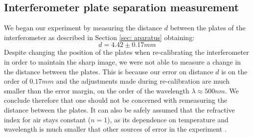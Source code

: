 \documentclass[11pt]{article}
\begin{document}
\subsection{Interferometer plate separation measurement} 
\label{sec: d}
We began our experiment by measuring the distance $d$ between the plates of the interferometer as described in Section \ref{sec: aparatus} obtaining: 
\begin{equation}
    d = 4.42 \pm 0.17 \si{mm} \label{res: d value}
\end{equation}
Despite changing the position of the plates when re-calibrating the interferometer in order to maintain the sharp image, we were not able to measure a change in the distance between the plates. This is because our error on distance $d$ is on the order of $0.17 \si{mm}$ and the adjustments made during re-calibration are much smaller than the error margin, on the order of the wavelength $\lambda \approx 500 \si{nm}$. We conclude therefore that one should not be concerned with remeasuring the distance between the plates. It can also be safely assumed that the refractive index for air stays constant ($n=1$), as its dependence on temperature and wavelength is much smaller that other sources of error in the experiment \cite{Polyanskiy2024}. 
\end{document}
